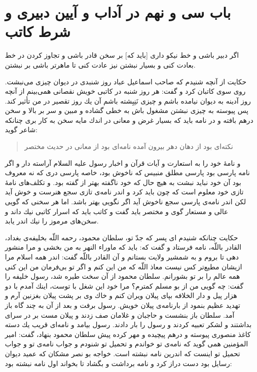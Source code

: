 \section*{باب سى و نهم
در آداب و آيين دبيرى و شرط كاتب}

اگر دبير باشى و خط نيكو دارى [بايد كه] بر سخن قادر باشى و تجاوز كردن در خط بعادت كنى و بسيار نبشتن نيز عادت كنى تا ماهرتر باشى بر نبشتن.

حكايت از آنچه شنيدم كه صاحب اسماعيل عباد روز شنبدى در ديوان چيزى مى‌نبشت. روى سوى كاتبان كرد و گفت: هر روز شنبه در كاتبى خويش نقصانى همى‌بينم از آنچه روز آدينه به ديوان نيامده باشم و چيزى نَنِبِشته باشم آن يك روز تقصير در من تأثير كند. پس پيوسته به چيزى نبشتن مشغول باش به خطى گشاده و مبين و سر بر بالا و سخن درهم بافته و در نامه بايد كه بسيار غرض و معانى در اندك مايه سخن به كار برى چنانكه شاعر گويد:

\begin{quote}
نكته‌اى بود از دهان دهر بيرون آمده\quad \quad
نامه‌اى بود از معانى در حديث مختصر
\end{quote}

و نامۀ خود را به استعارت و آيات قرآن و اخبار رسول عليه السلام آراسته دار و اگر نامه پارسى بود پارسى مطلق منبيس كه ناخوش بود، خاصه پارسى درى كه نه معروف بود آن خود نبايد نبشت به هيچ حال كه خود ناگفته بهتر از گفته بود. و تكلف‌هاى نامۀ تازى خود معلوم است كه چون بايد كرد و اندر نامه‌ی تازى سجع هنرست و خوش آيد لكن اندر نامه‌ی پارسى سجع ناخوش آيد اگر نگويى بهتر باشد. اما هر سخنى كه گويى عالى و مستعار گوى و مختصر بايد گفت و كاتب بايد كه اسرار كاتبى نيك داند و سخن‌هاى مرموز را نيك اندر يابد.

حكايت چنانكه شنيدم اى پسر كه جدّ تو، سلطان محمود، رحمه اللّه بخليفه‌ی بغداد، القادر باللّه، نامه فرستاد و گفت كه: بايد كه ماورا‌ء النهر به من بخشى و مرا منشور دهى تا بروم و به شمشير ولايت بستانم و آن القادر باللّه گفت: اندر همه اسلام مرا ازيشان مطيع‌تر كس نيست معاذ اللّه كه من اين كنم و اگر تو بى‌فرمان من اين كنى همه عالم را بر تو بشورانم. سلطان محمود از آن سخت طيره شد، رسول خليفه را گفت: چه گويى من از بو مسلم كمترم‌؟ مرا خود اين شغل با توست، اينك آمدم با دو هزار پيل و دار الخلافه بپاى پيلان ويران كنم و خاك وى بر پشت پيلان بغزنين آرم و تهديد عظيم بنمود از بارنامه‌ی پيلان خويش. رسول برفت و بعد از آن به چند گاه باز آمد. سلطان باز بنشست و حاجبان و غلامان صف زدند و پيلان مست بر در سراى بداشتند و لشكر تعبيه كردند و رسول را بار دادند. رسول بيامد و نامه‌اى قريب يك دسته كاغذ منصورى پيوسته و درهم پيچيده و مهر كرده پيش سلطان محمود بنهاد، گفت: امير المؤمنين همى گويد كه نامه‌ی تو خواندم و تحميل تو شنودم و جواب نامه‌ی تو و جواب تحميل تو اينست كه اندرين نامه نبشته است. خواجه بو نصر مشكان كه عميد ديوان رسايل بود دست دراز كرد و نامه برداشت و بگشاد تا بخواند اول نامه نبشته بود:

